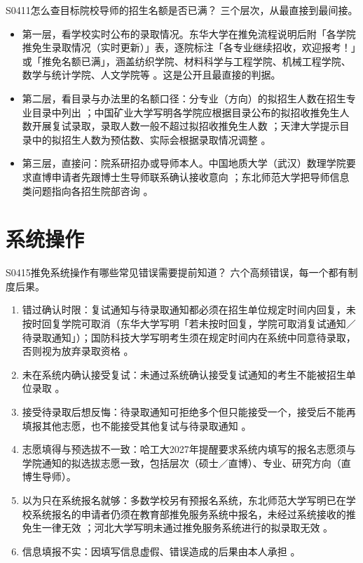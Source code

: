 \begin{qa}{S0411}{怎么查目标院校导师的招生名额是否已满？}
三个层次，从最直接到最间接。
\begin{itemize}
  \item 第一层，看学校实时公布的录取情况。东华大学在推免流程说明后附「各学院推免生录取情况（实时更新）」表，逐院标注「各专业继续招收，欢迎报考！」或「推免名额已满」，涵盖纺织学院、材料科学与工程学院、机械工程学院、数学与统计学院、人文学院等 。这是公开且最直接的判据。
  \item 第二层，看目录与办法里的名额口径：分专业（方向）的拟招生人数在招生专业目录中列出 ；中国矿业大学写明各学院应根据目录公布的拟招收推免生人数开展复试录取，录取人数一般不超过拟招收推免生人数 ；天津大学提示目录中的拟招生人数为预估数、实际会根据录取情况调整 。
  \item 第三层，直接问：院系研招办或导师本人。中国地质大学（武汉）数理学院要求直博申请者先跟博士生导师联系确认接收意向 ；东北师范大学把导师信息类问题指向各招生院部咨询 。
\end{itemize}
\end{qa}

\section{系统操作}
\begin{qa}{S0415}{推免系统操作有哪些常见错误需要提前知道？}
六个高频错误，每一个都有制度后果。
\begin{enumerate}
  \item 错过确认时限：复试通知与待录取通知都必须在招生单位规定时间内回复，未按时回复学院可取消（东华大学写明「若未按时回复，学院可取消复试通知／待录取通知」）；国防科技大学写明考生须在规定时间内在系统中同意待录取，否则视为放弃录取资格 。
  \item 未在系统内确认接受复试：未通过系统确认接受复试通知的考生不能被招生单位录取 。
  \item 接受待录取后想反悔：待录取通知可拒绝多个但只能接受一个，接受后不能再填报其他志愿，也不能接受其他复试与待录取通知 。
  \item 志愿填得与预选拔不一致：哈工大2027年提醒要求系统内填写的报名志愿须与学院通知的拟选拔志愿一致，包括层次（硕士／直博）、专业、研究方向（直博生导师）。
  \item 以为只在系统报名就够：多数学校另有预报名系统，东北师范大学写明已在学校系统报名的申请者仍须在教育部推免服务系统中报名，未经过系统接收的推免生一律无效 ；河北大学写明未通过推免服务系统进行的拟录取无效 。
  \item 信息填报不实：因填写信息虚假、错误造成的后果由本人承担 。
\end{enumerate}
\end{qa}


